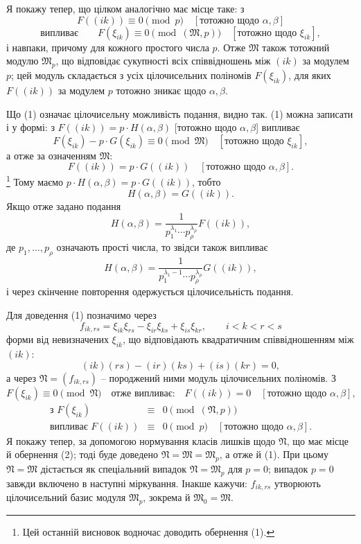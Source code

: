 \documentclass[11pt]{article}
\providecommand{\frM}{\mathfrak M}
\providecommand{\frN}{\mathfrak N}
\begin{document}
Я покажу тепер, що цілком аналогічно має місце таке: з
\[
        F((ik))\equiv0\pmod p\quad [\text{тотожно щодо \(\alpha,\beta\)}]
\]
\begin{equation}
        \text{випливає}\qquad
        F(\xi_{ik})\equiv0\pmod{(\frM,p)}\quad [\text{тотожно щодо \(\xi_{ik}\)}],
\end{equation}
і навпаки, причому для кожного простого числа \(p\). Отже \(\frM\) також тотожний модулю \(\frM_p\), що відповідає сукупності всіх співвідношень між \((ik)\) за модулем \(p\); цей модуль складається з усіх цілочисельних поліномів \(F(\xi_{ik})\), для яких \(F((ik))\) за модулем \(p\) тотожно зникає щодо \(\alpha,\beta\).

Що (1) означає цілочисельну можливість подання, видно так. (1) можна записати і у формі: з \(F((ik))=p\cdot H(\alpha,\beta)\) [тотожно щодо \(\alpha,\beta\)] випливає
\[
        F(\xi_{ik})-p\cdot G(\xi_{ik})\equiv0\pmod{\frM}
        \quad [\text{тотожно щодо \(\xi_{ik}\)}],
\]
а отже за означенням \(\frM\):
\[
        F((ik))=p\cdot G((ik))\quad [\text{тотожно щодо \(\alpha,\beta\)}].
\]
\footnote{Цей останній висновок водночас доводить обернення (1).}
Тому маємо \(p\cdot H(\alpha,\beta)=p\cdot G((ik))\), тобто
\[
        H(\alpha,\beta)=G((ik)).
\]
Якщо отже задано подання
\[
        H(\alpha,\beta)
        =
        \frac1{p_1^{\lambda_1}\cdots p_\rho^{\lambda_\rho}}
        F((ik)),
\]
де \(p_1,\ldots,p_\rho\) означають прості числа, то звідси також випливає
\[
        H(\alpha,\beta)
        =
        \frac1{p_1^{\lambda_1-1}\cdots p_\rho^{\lambda_\rho}}
        G((ik)),
\]
і через скінченне повторення одержується цілочисельність подання.

Для доведення (1) позначимо через
\[
        f_{ik,rs}=\xi_{ik}\xi_{rs}-\xi_{ir}\xi_{ks}+\xi_{is}\xi_{kr},
        \qquad i<k<r<s
\]
форми від невизначених \(\xi_{ik}\), що відповідають квадратичним співвідношенням між \((ik)\):
\[
        (ik)(rs)-(ir)(ks)+(is)(kr)=0,
\]
а через \(\frN=(f_{ik,rs})\) -- породжений ними модуль цілочисельних поліномів. З
\[
        F(\xi_{ik})\equiv0\pmod{\frN}
        \quad\text{отже випливає:}\quad
        F((ik))=0\quad [\text{тотожно щодо \(\alpha,\beta\)}],
\]
\begin{equation}
\begin{array}{rcl}
        \text{з }F(\xi_{ik})&\equiv&0\pmod{(\frN,p)}\\
        \text{випливає }F((ik))&\equiv&0\pmod p\quad[\text{тотожно щодо \(\alpha,\beta\)}].
\end{array}
\end{equation}
Я покажу тепер, за допомогою нормування класів лишків щодо \(\frN\), що має місце й обернення (2); тоді буде доведено \(\frN=\frM=\frM_p\), а отже й (1). При цьому \(\frN=\frM\) дістається як спеціальний випадок \(\frN=\frM_p\) для \(p=0\); випадок \(p=0\) завжди включено в наступні міркування. Інакше кажучи: \(f_{ik,rs}\) утворюють цілочисельний базис модуля \(\frM_p\), зокрема й \(\frM_0=\frM\).
\end{document}
